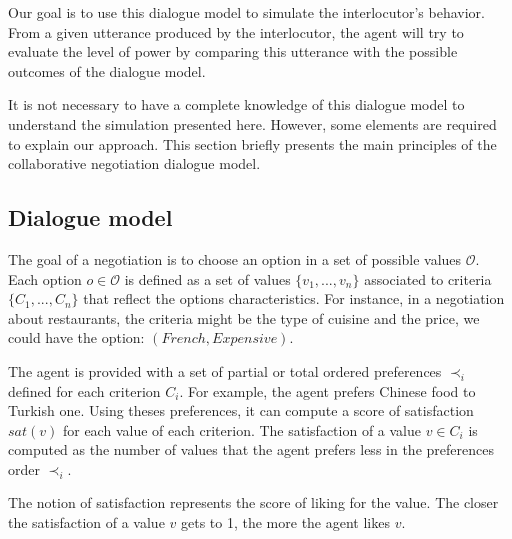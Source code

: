 \documentclass[sigconf]{aamas}  %
\begin{document}
	Our goal is to use this dialogue model to simulate the interlocutor's behavior. From a given utterance produced by the interlocutor, the agent will try to evaluate the level of power by comparing this utterance with the possible outcomes of the dialogue model.
	
	It is not necessary to have a complete knowledge of this dialogue model to understand the simulation presented here. However, some elements are required to explain our approach. This section briefly presents the main principles of the collaborative negotiation dialogue model.
	
	\subsection{Dialogue model}
	\label{sec:dialogue-model}
	
	The goal of a negotiation is to choose an option in a set of possible values $\mathcal{O}$. Each option $o\in\mathcal{O}$ is defined as a set of values $\{v_1, ..., v_n\}$ associated to criteria $\{C_1, ..., C_n\}$ that reflect the options characteristics.  For instance, in a negotiation about restaurants, the criteria might be the type of cuisine and the price, we could have the option: $(French,Expensive)$.
	
	The agent is provided with a set of partial or total ordered preferences $\prec_i$ defined for each criterion $C_i$. For example, the agent prefers Chinese food to Turkish one. Using theses preferences, it can compute a score of satisfaction $sat(v)$ for each value of each criterion. The satisfaction of a value $v \in C_i$ is computed as the number of values that the agent prefers less in the preferences order $\prec_i$.
	
%	
	The notion of satisfaction represents the score of liking for the value. The closer the satisfaction of a value $v$ gets to 1, the more the agent likes $v$.
	
\end{document}

